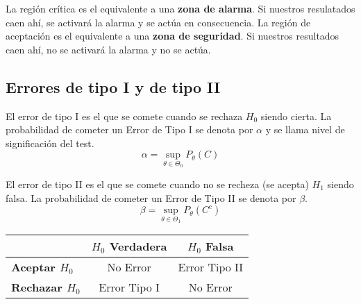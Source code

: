 \begin{observación}
    La región crítica es el equivalente a una \textbf{zona de alarma}. Si nuestros resulatados caen ahí, se activará la alarma y se actúa en consecuencia. La región de aceptación es el equivalente a una \textbf{zona de seguridad}. Si nuestros resultados caen ahí, no se activará la alarma y no se actúa. 
\end{observación}


\subsection{Errores de tipo I y de tipo II}
\begin{definición}
    El error de tipo I es el que se comete cuando se rechaza $H_0$ siendo cierta. La probabilidad de cometer un Error de Tipo I se denota por $\alpha$ 
    y se llama nivel de significación del test.
    $$\alpha = \sup_{\theta \in \Theta_0} P_{\theta}(C)$$
\end{definición}

\begin{definición}
    El error de tipo II es el que se comete cuando no se recheza (se acepta) $H_1$ siendo falsa. La probabilidad de cometer un Error de Tipo II se denota por $\beta$.
    $$\beta = \sup_{\theta \in \Theta_1} P_{\theta}(C^c)$$
\end{definición}

\begin{center}
    \begin{tabular}{|l|c|c|}
        \hline
         & \textbf{$H_0$ Verdadera} & \textbf{$H_0$ Falsa} \\
        \hline
        \textbf{Aceptar $H_0$} & No Error & Error Tipo II \\
        \hline
        \textbf{Rechazar $H_0$} & Error Tipo I & No Error \\
        \hline
    \end{tabular}
\end{center}


